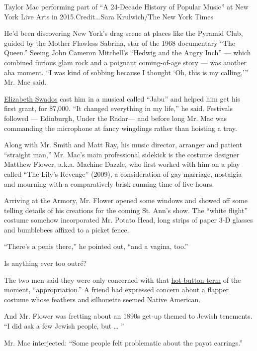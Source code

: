Taylor Mac performing part of ``A 24-Decade History of Popular Music''
at New York Live Arts in 2015.Credit...Sara Krulwich/The New York Times

He'd been discovering New York's drag scene at places like the Pyramid
Club, guided by the Mother Flawless Sabrina, star of the 1968
documentary ``The Queen.'' Seeing John Cameron Mitchell's ``Hedwig and
the Angry Inch'' --- which combined furious glam rock and a poignant
coming-of-age story --- was another aha moment. ``I was kind of sobbing
because I thought `Oh, this is my calling,''' Mr. Mac said.

\href{http://www.nytimes3xbfgragh.onion/2016/01/06/arts/elizabeth-swados-creator-of-socially-conscious-musicals-is-dead-at-64.html?_r=0}{Elizabeth
Swados} cast him in a musical called ``Jabu'' and helped him get his
first grant, for \$7,000. ``It changed everything in my life,'' he said.
Festivals followed --- Edinburgh, Under the Radar--- and before long Mr.
Mac was commanding the microphone at fancy wingdings rather than
hoisting a tray.

Along with Mr. Smith and Matt Ray, his music director, arranger and
patient ``straight man,'' Mr. Mac's main professional sidekick is the
costume designer Matthew Flower, a.k.a. Machine Dazzle, who first worked
with him on a play called ``The Lily's Revenge'' (2009), a consideration
of gay marriage, nostalgia and mourning with a comparatively brisk
running time of five hours.

Arriving at the Armory, Mr. Flower opened some windows and showed off
some telling details of his creations for the coming St. Ann's show. The
``white flight'' costume somehow incorporated Mr. Potato Head, long
strips of paper 3-D glasses and bumblebees affixed to a picket fence.

``There's a penis there,'' he pointed out, ``and a vagina, too.''

Is anything ever too outré?

The two men said they were only concerned with that
\href{http://www.nytimes3xbfgragh.onion/2016/09/13/books/lionel-shriver-cultural-appropriation-brisbane-writers-festival.html}{hot-button
term} of the moment, ``appropriation.'' A friend had expressed concern
about a flapper costume whose feathers and silhouette seemed Native
American.

And Mr. Flower was fretting about an 1890s get-up themed to Jewish
tenements. ``I did ask a few Jewish people, but \ldots{} ''

Mr. Mac interjected: ``Some people felt problematic about the payot
earrings.''

